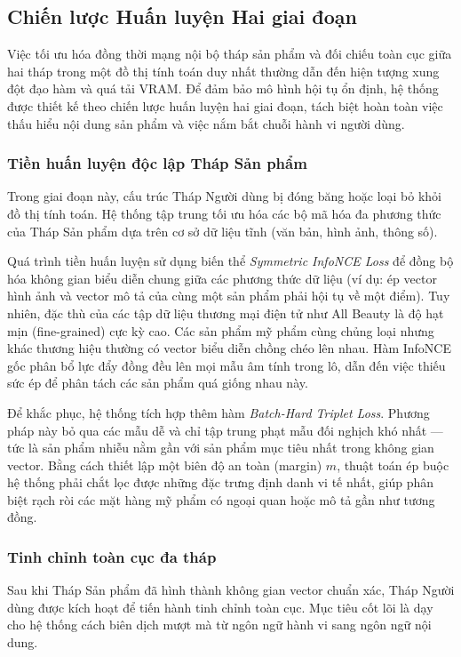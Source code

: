 \subsection{Chiến lược Huấn luyện Hai giai đoạn}

Việc tối ưu hóa đồng thời mạng nội bộ tháp sản phẩm và đối chiếu toàn cục giữa hai tháp trong một đồ thị tính toán duy nhất thường dẫn đến hiện tượng xung đột đạo hàm và quá tải VRAM. Để đảm bảo mô hình hội tụ ổn định, hệ thống được thiết kế theo chiến lược huấn luyện hai giai đoạn, tách biệt hoàn toàn việc thấu hiểu nội dung sản phẩm và việc nắm bắt chuỗi hành vi người dùng.

\subsubsection{Tiền huấn luyện độc lập Tháp Sản phẩm}

Trong giai đoạn này, cấu trúc Tháp Người dùng bị đóng băng hoặc loại bỏ khỏi đồ thị tính toán. Hệ thống tập trung tối ưu hóa các bộ mã hóa đa phương thức của Tháp Sản phẩm dựa trên cơ sở dữ liệu tĩnh (văn bản, hình ảnh, thông số).

Quá trình tiền huấn luyện sử dụng biến thể \textit{Symmetric InfoNCE Loss} để đồng bộ hóa không gian biểu diễn chung giữa các phương thức dữ liệu (ví dụ: ép vector hình ảnh và vector mô tả của cùng một sản phẩm phải hội tụ về một điểm). Tuy nhiên, đặc thù của các tập dữ liệu thương mại điện tử như All Beauty là độ hạt mịn (fine-grained) cực kỳ cao. Các sản phẩm mỹ phẩm cùng chủng loại nhưng khác thương hiệu thường có vector biểu diễn chồng chéo lên nhau. Hàm InfoNCE gốc phân bổ lực đẩy đồng đều lên mọi mẫu âm tính trong lô, dẫn đến việc thiếu sức ép để phân tách các sản phẩm quá giống nhau này.

Để khắc phục, hệ thống tích hợp thêm hàm \textit{Batch-Hard Triplet Loss}. Phương pháp này bỏ qua các mẫu dễ và chỉ tập trung phạt mẫu đối nghịch khó nhất — tức là sản phẩm nhiễu nằm gần với sản phẩm mục tiêu nhất trong không gian vector. Bằng cách thiết lập một biên độ an toàn (margin) $m$, thuật toán ép buộc hệ thống phải chắt lọc được những đặc trưng định danh vi tế nhất, giúp phân biệt rạch ròi các mặt hàng mỹ phẩm có ngoại quan hoặc mô tả gần như tương đồng.

\subsubsection{Tinh chỉnh toàn cục đa tháp}

Sau khi Tháp Sản phẩm đã hình thành không gian vector chuẩn xác, Tháp Người dùng được kích hoạt để tiến hành tinh chỉnh toàn cục. Mục tiêu cốt lõi là dạy cho hệ thống cách biên dịch mượt mà từ ngôn ngữ hành vi sang ngôn ngữ nội dung.

